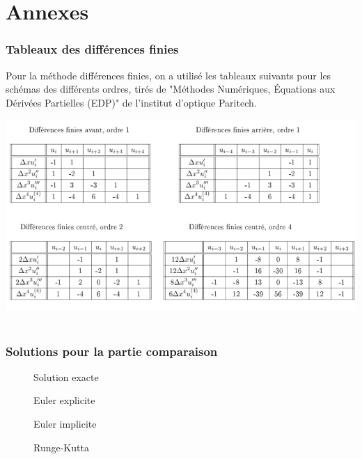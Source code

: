 \part*{Annexes}


\appendix
\section{Tableaux des différences finies}
Pour la méthode  différences finies, on a utilisé les tableaux suivants pour les schémas des différents ordres, tirés de "Méthodes Numériques, Équations aux Dérivées Partielles (EDP)" de l'institut d'optique Paritech.

\includegraphics[width=1\textwidth]{./annex1}~\\[1cm]

\section{Solutions pour la partie comparaison}
\begin{figure}[H]
\begin{minipage}[b]{.46\linewidth}
\centering{}
\caption{Solution exacte
    \label{fig1}
    }
\end{minipage} \hfill
\begin{minipage}[b]{.46\linewidth}
\centering{}
\caption{Euler explicite\label{fig2}}
\end{minipage}
\end{figure}

\begin{figure}[H]
\begin{minipage}[b]{.46\linewidth}
\centering{}
\caption{Euler implicite\label{fig1}}
\end{minipage} \hfill
\begin{minipage}[b]{.46\linewidth}
\centering{}
\caption{Runge-Kutta \label{fig2}}
\end{minipage}
\end{figure}

